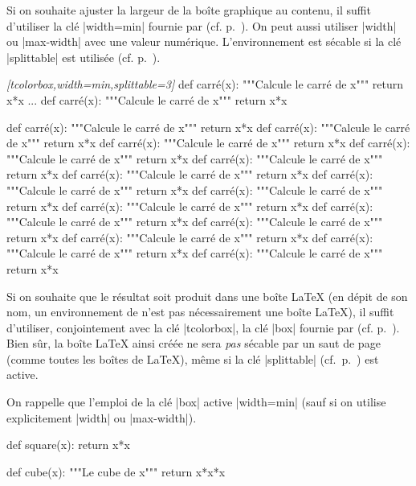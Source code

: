 \documentclass[dvipsnames,svgnames]{article}
\begin{document}
\bigskip
Si on souhaite ajuster la largeur de la boîte graphique au contenu, il suffit
d'utiliser la clé |width=min| fournie par  (cf. p.~\pageref{width}).
On peut aussi utiliser |width| ou |max-width| avec une valeur numérique.
L'environnement est sécable si la clé |splittable| est utilisée
(cf. p.~\pageref{coupure-de-pages}).

\smallskip
\begin{Code}
\begin{Piton}\emph{[tcolorbox,width=min,splittable=3]}
def carré(x):
    """Calcule le carré de x"""
    return x*x
...
def carré(x):
    """Calcule le carré de x"""
    return x*x
\end{Piton}
\end{Code}

\smallskip
\begin{Piton}[tcolorbox,width=min,splittable=3]
def carré(x):
    """Calcule le carré de x"""
    return x*x
def carré(x):
    """Calcule le carré de x"""
    return x*x
def carré(x):
    """Calcule le carré de x"""
    return x*x
def carré(x):
    """Calcule le carré de x"""
    return x*x
def carré(x):
    """Calcule le carré de x"""
    return x*x
def carré(x):
    """Calcule le carré de x"""
    return x*x
def carré(x):
    """Calcule le carré de x"""
    return x*x
def carré(x):
    """Calcule le carré de x"""
    return x*x
def carré(x):
    """Calcule le carré de x"""
    return x*x
def carré(x):
    """Calcule le carré de x"""
    return x*x
def carré(x):
    """Calcule le carré de x"""
    return x*x
def carré(x):
    """Calcule le carré de x"""
    return x*x
def carré(x):
    """Calcule le carré de x"""
    return x*x
def carré(x):
    """Calcule le carré de x"""
    return x*x
\end{Piton}



\bigskip
Si on souhaite que le résultat soit produit dans une boîte LaTeX (en dépit de son nom,
un environnement de  n'est pas nécessairement une boîte LaTeX),
il suffit d'utiliser, conjointement avec la clé |tcolorbox|, la clé |box| fournie
par  (cf. p.~\pageref{box}). Bien sûr, la boîte LaTeX ainsi créée ne sera \emph{pas}
sécable par un saut de page (comme toutes les boîtes de LaTeX), même si la clé |splittable|
(cf.~p.~\pageref{splittable}) est active.

On rappelle que l'emploi de la clé |box| active |width=min| (sauf si on utilise
explicitement |width| ou |max-width|).

\smallskip
\begin{Code}
\begin{center}
\begin{Piton}
def square(x):
    return x*x
\end{Piton}
\hspace{1cm}
\begin{Piton}
def cube(x):
    """Le cube de x"""
    return x*x*x
\end{Piton}
\end{center}
\end{Code}
\end{document}
